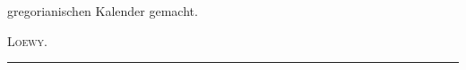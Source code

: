 gregorianischen Kalender gemacht.\begingroup\renewcommand{\thefootnote}{}\endgroup
\begin{flushright}\textsc{Loewy.}\end{flushright}
\endgroup
\begin{center}\rule{.24\textwidth}{.35pt}\end{center}
\clearpage\endgroup
